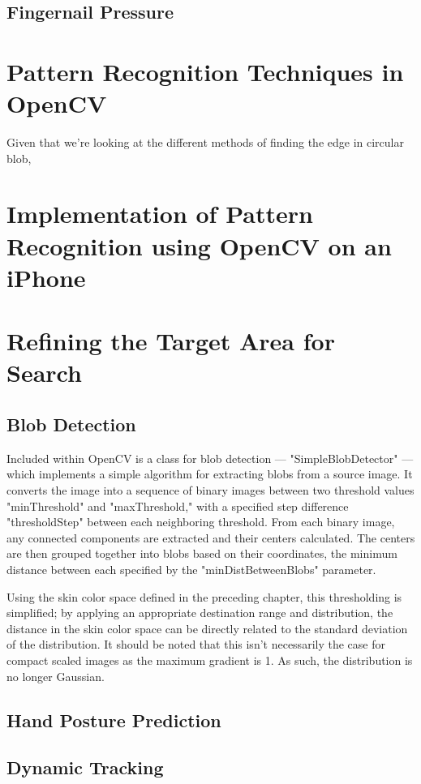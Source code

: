 \subsection{Fingernail Pressure}\label{sec:FingernailPressure}
\section{Pattern Recognition Techniques in OpenCV}\label{sec:PaternRecognitionOpenCV}
Given that we're looking at the different methods of finding the edge in circular blob, 
\section{Implementation of Pattern Recognition using OpenCV on an iPhone}\label{sec:ImplementationOnIPhone}

\section{Refining the Target Area for Search}\label{sec:RefiningTargetAreaForSearch}
\subsection{Blob Detection}\label{sec:BlobDetection}
Included within OpenCV is a class for blob detection --- "SimpleBlobDetector" --- which implements a simple algorithm for extracting blobs from a source image. It converts the image into a sequence of binary images between two threshold values "minThreshold" and "maxThreshold," with a specified step difference "thresholdStep" between each neighboring threshold. From each binary image, any connected components are extracted and their centers calculated. The centers are then grouped together into blobs based on their coordinates, the minimum distance between each specified by the "minDistBetweenBlobs" parameter.

Using the skin color space defined in the preceding chapter, this thresholding is simplified; by applying an appropriate destination range and distribution, the distance in the skin color space can be directly related to the standard deviation of the distribution. It should be noted that this isn't necessarily the case for compact scaled images as the maximum gradient is 1. As such, the distribution is no longer Gaussian.

\subsection{Hand Posture Prediction}\label{sec:HandPosturePrediction}
\subsection{Dynamic Tracking}\label{sec:DynamicTracking}
